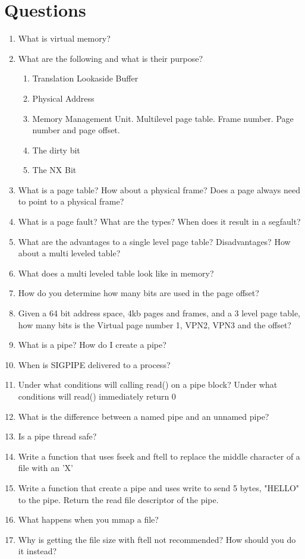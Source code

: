 \section{Questions}

\begin{enumerate}
\item What is virtual memory?
\item What are the following and what is their purpose?
  \begin{enumerate}
    \item Translation Lookaside Buffer
    \item Physical Address
    \item Memory Management Unit. Multilevel page table. Frame number. Page number and page offset.
    \item The dirty bit
    \item The NX Bit
  \end{enumerate}
\item What is a page table? How about a physical frame? Does a page always need to point to a physical frame?
\item What is a page fault? What are the types? When does it result in a segfault?
\item What are the advantages to a single level page table? Disadvantages? How about a multi leveled table?
\item What does a multi leveled table look like in memory?
\item How do you determine how many bits are used in the page offset?
\item Given a 64 bit address space, 4kb pages and frames, and a 3 level page table, how many bits is the Virtual page number 1, VPN2, VPN3 and the offset?
\item What is a pipe? How do I create a pipe?
\item When is SIGPIPE delivered to a process?
\item Under what conditions will calling read() on a pipe block? Under what conditions will read() immediately return 0
\item What is the difference between a named pipe and an unnamed pipe?
\item Is a pipe thread safe?
\item Write a function that uses fseek and ftell to replace the middle character of a file with an 'X'
\item Write a function that create a pipe and uses write to send 5 bytes, "HELLO" to the pipe. Return the read file descriptor of the pipe.
\item What happens when you mmap a file?
\item Why is getting the file size with ftell not recommended? How should you do it instead?
\end{enumerate}




